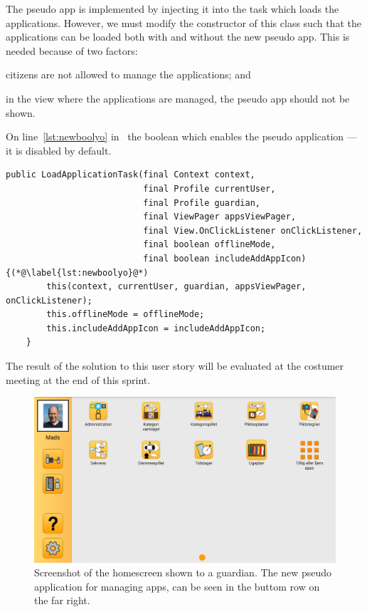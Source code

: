 The pseudo app is implemented by injecting it into the task which loads the applications.
However, we must modify the constructor of this class such that the applications can be loaded both with and without the new pseudo app.
This is needed because of two factors: 
\begin{enumberate*}
    \item citizens are not allowed to manage the applications; and
    \item in the view where the applications are managed, the pseudo app should not be shown.
\end{enumberate*}
On line~\ref{lst:newboolyo} in~ the boolean which enables the pseudo application --- it is disabled by default. 

\begin{lstlisting}[float, floatplacement=h!, label={lst:modified_constructor}, caption={The new constructor which instantiates the task that loads the applications in the GIRAF launcher}] 
public LoadApplicationTask(final Context context,
                           final Profile currentUser,
                           final Profile guardian,
                           final ViewPager appsViewPager,
                           final View.OnClickListener onClickListener,
                           final boolean offlineMode,
                           final boolean includeAddAppIcon) {(*@\label{lst:newboolyo}@*) 
        this(context, currentUser, guardian, appsViewPager, onClickListener);
        this.offlineMode = offlineMode;
        this.includeAddAppIcon = includeAddAppIcon;
    }
\end{lstlisting}

\bigskip
The result of the solution to this user story will be evaluated at the costumer meeting at the end of this sprint.

\begin{figure}[h!]
    \includegraphics[width=\textwidth]{figures/img/screenshots/addapps_icon.png}
    \caption{Screenshot of the homescreen shown to a guardian. The new pseudo application for managing apps, can be seen in the buttom row on the far right.}\label{fig:addapps}
\end{figure}
